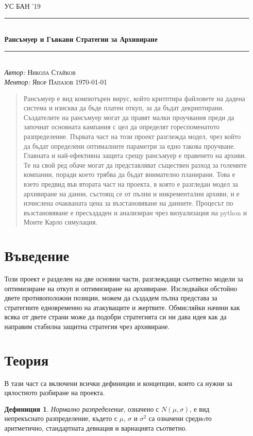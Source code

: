 \documentclass[11pt, a4paper]{article}
\theoremstyle{definition}
\newtheorem{definition}{Дефиниция}
\begin{document}
\begin{titlepage}
	\newcommand{\HRule}{\rule{\linewidth}{0.5mm}}
	\centering
	\textsc{\LARGE УС БАН '19}\\[1cm]
	\HRule\\[1 cm]
	{\huge\bfseries Рансъмуер и Гъвкави Стратегии за Архивиране}\\[1 cm]
	\HRule\\
    \vfill
			\Large
			\textit{Автор:}
			 \textsc{Никола Стайков}\\
             \vspace{2cm}
			\Large
			\textit{Ментор:}
            \textsc{Явор Папазов}
    \vfill	
	{\large\today}   
	\vfill
\end{titlepage}

\tableofcontents
\newpage
\begin{abstract}
		Рансъмуер е вид компютърен вирус, който критптира файловете на дадена система и изисква да бъде платен откуп, за да бъдат декриптирани. Създателите на рансъмуер могат да правят малки проучвания преди да започнат основната кампания с цел да определят гореспоменатото разпределение. Първата част на този проект разглежда модел, чрез който да бъдат определени оптималните параметри за едно такова проучване. Главната и най-ефективна защита срещу рансъмуер е правенето на архиви. Те на свой ред обаче могат да представляват съществен разход за големите компании, поради което трябва да бъдат внимателно планирани. Това е взето предвид във втората част на проекта, в която е разгледан модел за архивиране на данни, състоящ се от пълни и инкрементални архиви, и е изчислена очакваната цена за възстановяване на данните. Процесът по възстановяване е пресъздаден и анализиран чрез визуализация на python и Монте Карло симулация.
\end{abstract}

\section{Въведение}
		Този проект е разделен на две основни части, разглеждащи съответно модели за оптимизиране на откуп и оптимизиране на архивиране. Изследвайки обстойно двете противоположни позиции, можем да създадем пълна представа за стратегиите едновременно на атакуващите и жертвите. Обмисляйки начини как всяка от двете страни може да подобри стратегията си ни дава идея как да направим стабилна защитна стратегия чрез архивиране.
\section{Теория}
	В тази част са включени всички дефиниции и концепции, които са нужни за цялостното разбиране на проекта.
		\begin{definition}
			\label{def:normdist}
			\emph{Нормално разпределение}, означено  с $N(\mu, \sigma)$, е вид непрекъснато разпределение, където с $\mu$, $\sigma$ и $\sigma^{2}$ са означени среднoто аритметично, стандартната девиация и вариацията съответно.
		\end{definition}
	
\end{document}

